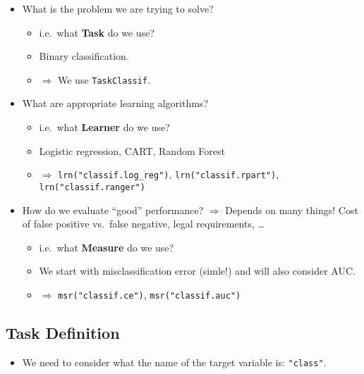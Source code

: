 \documentclass[]{article}
\newenvironment{Shaded}{\begin{snugshade}}{\end{snugshade}}
\newcommand{\KeywordTok}[1]{\textcolor[rgb]{0.13,0.29,0.53}{\textbf{#1}}}
\newcommand{\NormalTok}[1]{#1}
\newcommand{\OperatorTok}[1]{\textcolor[rgb]{0.81,0.36,0.00}{\textbf{#1}}}
\newcommand{\StringTok}[1]{\textcolor[rgb]{0.31,0.60,0.02}{#1}}
\providecommand{\tightlist}{%
  \setlength{\itemsep}{0pt}\setlength{\parskip}{0pt}}
\begin{document}
\begin{itemize}
\tightlist
\item
  What is the problem we are trying to solve?

  \begin{itemize}
  \tightlist
  \item
    i.e.~what \textbf{Task} do we use?
  \item
    Binary classification.
  \item
    \(\Rightarrow\) We use \texttt{TaskClassif}.
  \end{itemize}
\item
  What are appropriate learning algorithms?

  \begin{itemize}
  \tightlist
  \item
    i.e.~what \textbf{Learner} do we use?
  \item
    Logistic regression, CART, Random Forest
  \item
    \(\Rightarrow\) \texttt{lrn("classif.log\_reg")},
    \texttt{lrn("classif.rpart")}, \texttt{lrn("classif.ranger")}
  \end{itemize}
\item
  How do we evaluate ``good'' performance? \(\Rightarrow\) Depends on
  many things! Cost of false positive vs.~false negative, legal
  requirements, \ldots{}

  \begin{itemize}
  \tightlist
  \item
    i.e.~what \textbf{Measure} do we use?
  \item
    We start with misclassification error (simle!) and will also
    consider AUC.
  \item
    \(\Rightarrow\) \texttt{msr("classif.ce")},
    \texttt{msr("classif.auc")}
  \end{itemize}
\end{itemize}

\hypertarget{task-definition}{%
\subsection{Task Definition}\label{task-definition}}

\begin{itemize}
\tightlist
\item
  We need to consider what the name of the target variable is:
  \texttt{"class"}.
\end{itemize}

\begin{Shaded}
\end{Shaded}
\end{document}
